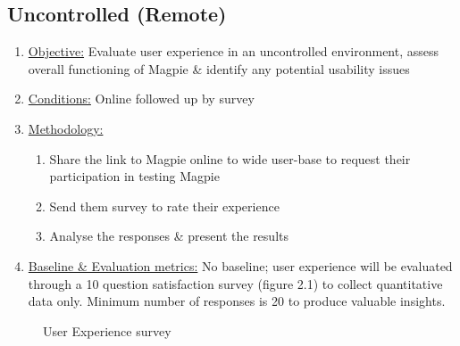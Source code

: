 \documentclass{report}
\begin{document}
\subsection{Uncontrolled (Remote)}
\begin{enumerate}
    \item \underline{Objective:} Evaluate user experience in an uncontrolled
          environment, assess overall functioning of Magpie \& identify any
          potential usability issues
    \item \underline{Conditions:} Online followed up by survey
    \item \underline{Methodology:}
          \begin{enumerate}
              \item Share the link to Magpie online to wide user-base to request their participation in testing Magpie
              \item Send them survey to rate their experience
              \item Analyse the responses \& present the results
          \end{enumerate}
    \item \underline{Baseline \& Evaluation metrics:} No baseline; user experience will be evaluated through a 10 question satisfaction survey (figure 2.1) to collect quantitative data only. Minimum number of responses is 20 to produce valuable insights.
\end{enumerate}

\begin{figure}
    \begin{minipage}{\textwidth}
        \centering
        \caption{User Experience survey}
        \label{fig:plot9}
    \end{minipage}
\end{figure}
\end{document}
